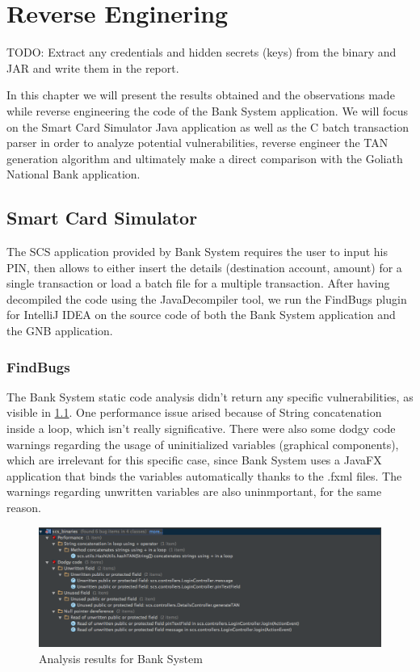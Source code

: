 \chapter{Reverse Enginering}\label{chapter:reverse_engineering}

TODO: Extract any credentials and hidden secrets (keys) from the binary and JAR and write them in the report.


In this chapter we will present the results obtained and the observations made while reverse engineering the code of the Bank System application.
We will focus on the Smart Card Simulator Java application as well as the C batch transaction parser in order to analyze potential vulnerabilities, reverse engineer the TAN generation algorithm and ultimately make a direct comparison with the Goliath National Bank application.

\section{Smart Card Simulator}
The SCS application provided by Bank System requires the user to input his PIN, then allows to either insert the details (destination account, amount) for a single transaction or load a batch file for a multiple transaction.\newline
After having decompiled the code using the JavaDecompiler tool, we run the FindBugs plugin for IntelliJ IDEA on the source code of both the Bank System application and the GNB application.\newline

\subsection{FindBugs}
The Bank System static code analysis didn't return any specific vulnerabilities, as visible in \ref{figure:bs_findBugs}.\newline
One performance issue arised because of String concatenation inside a loop, which isn't really significative. There were also some dodgy code warnings regarding the usage of uninitialized variables (graphical components), which are irrelevant for this specific case, since Bank System uses a JavaFX application that binds the variables automatically thanks to the .fxml files. The warnings regarding unwritten variables are also uninmportant, for the same reason.

\begin{figure}[h!tbp]
	\centering
	\includegraphics[width=\textwidth]{figures/bs_findBugs}
	\caption{Analysis results for Bank System}
	\label{figure:bs_findBugs}
\end{figure}

